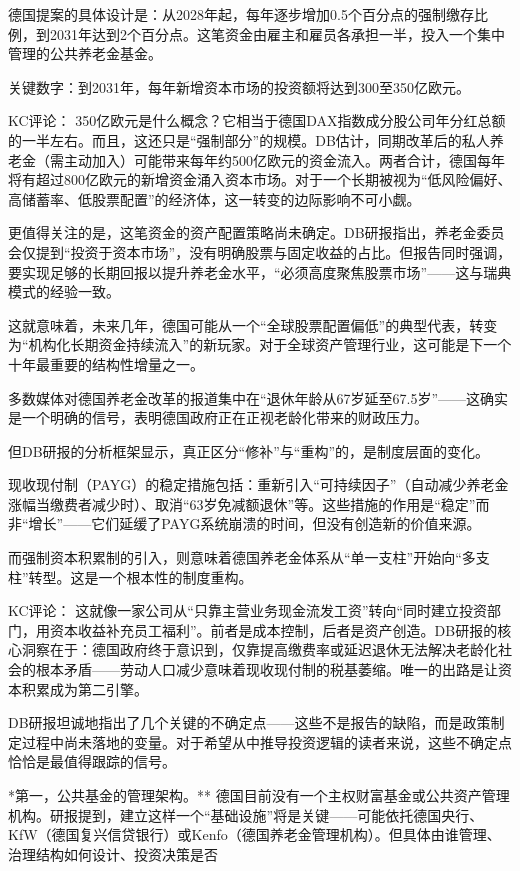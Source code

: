 \documentclass[11pt]{ctexart}
\begin{document}
德国提案的具体设计是：从2028年起，每年逐步增加0.5个百分点的强制缴存比例，到2031年达到2个百分点。这笔资金由雇主和雇员各承担一半，投入一个集中管理的公共养老金基金。

关键数字：到2031年，每年新增资本市场的投资额将达到300至350亿欧元。

KC评论： 350亿欧元是什么概念？它相当于德国DAX指数成分股公司年分红总额的一半左右。而且，这还只是“强制部分”的规模。DB估计，同期改革后的私人养老金（需主动加入）可能带来每年约500亿欧元的资金流入。两者合计，德国每年将有超过800亿欧元的新增资金涌入资本市场。对于一个长期被视为“低风险偏好、高储蓄率、低股票配置”的经济体，这一转变的边际影响不可小觑。

更值得关注的是，这笔资金的资产配置策略尚未确定。DB研报指出，养老金委员会仅提到“投资于资本市场”，没有明确股票与固定收益的占比。但报告同时强调，要实现足够的长期回报以提升养老金水平，“必须高度聚焦股票市场”——这与瑞典模式的经验一致。

这就意味着，未来几年，德国可能从一个“全球股票配置偏低”的典型代表，转变为“机构化长期资金持续流入”的新玩家。对于全球资产管理行业，这可能是下一个十年最重要的结构性增量之一。

多数媒体对德国养老金改革的报道集中在“退休年龄从67岁延至67.5岁”——这确实是一个明确的信号，表明德国政府正在正视老龄化带来的财政压力。

但DB研报的分析框架显示，真正区分“修补”与“重构”的，是制度层面的变化。

现收现付制（PAYG）的稳定措施包括：重新引入“可持续因子”（自动减少养老金涨幅当缴费者减少时）、取消“63岁免减额退休”等。这些措施的作用是“稳定”而非“增长”——它们延缓了PAYG系统崩溃的时间，但没有创造新的价值来源。

而强制资本积累制的引入，则意味着德国养老金体系从“单一支柱”开始向“多支柱”转型。这是一个根本性的制度重构。

KC评论： 这就像一家公司从“只靠主营业务现金流发工资”转向“同时建立投资部门，用资本收益补充员工福利”。前者是成本控制，后者是资产创造。DB研报的核心洞察在于：德国政府终于意识到，仅靠提高缴费率或延迟退休无法解决老龄化社会的根本矛盾——劳动人口减少意味着现收现付制的税基萎缩。唯一的出路是让资本积累成为第二引擎。

DB研报坦诚地指出了几个关键的不确定点——这些不是报告的缺陷，而是政策制定过程中尚未落地的变量。对于希望从中推导投资逻辑的读者来说，这些不确定点恰恰是最值得跟踪的信号。

*第一，公共基金的管理架构。** 德国目前没有一个主权财富基金或公共资产管理机构。研报提到，建立这样一个“基础设施”将是关键——可能依托德国央行、KfW（德国复兴信贷银行）或Kenfo（德国养老金管理机构）。但具体由谁管理、治理结构如何设计、投资决策是否
\end{document}
